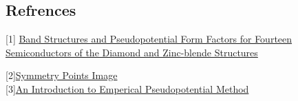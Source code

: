 \documentclass[%
 reprint,
 amsmath,amssymb,
 aps,
]{revtex4-2}
\begin{document}
\appendix


\subsection{\label{sec:level2}Refrences}

[1] \href{https://journals.aps.org/pr/abstract/10.1103/PhysRev.141.789}{Band Structures and Pseudopotential Form Factors for Fourteen Semiconductors of the Diamond and Zinc-blende Structures} \\
\bigskip

[2]\href{http://esd.cos.gmu.edu/tb/kpts/fcc/index.html}{Symmetry Points Image}\\

[3]\href{https://www.ece.nus.edu.sg/stfpage/eleadj/pseudopotential.htm}{An Introduction to Emperical Pseudopotential Method}
\end{document}
